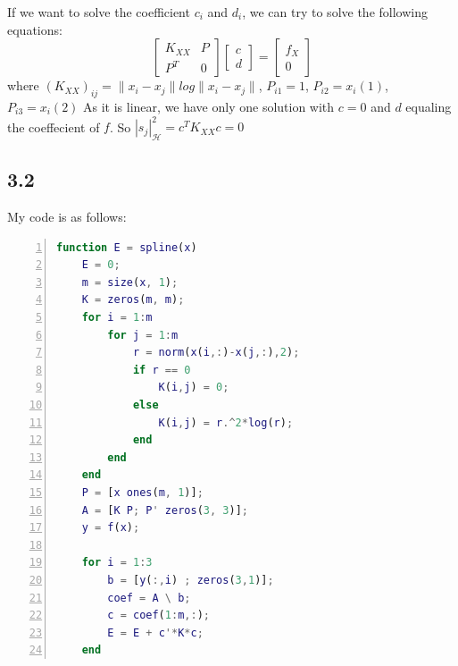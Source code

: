 \documentclass[a4paper, 11pt]{article}
\begin{document}
If we want to solve the coefficient $c_i$ and $d_i$, we can try to solve the following equations:
$$
\begin{bmatrix}
K_{XX} & P \\
P^T &    0
\end{bmatrix}
\begin{bmatrix}
c \\ d
\end{bmatrix}
=
\begin{bmatrix}
f_X \\ 0
\end{bmatrix}
$$
where $(K_{XX})_{ij} = \|x_i-x_j\|log\|x_i-x_j\|$,
$P_{i1}=1$, $P_{i2}=x_i(1)$, $P_{i3}=x_i(2)$
As it is linear, we have only one solution with $c=0$ and $d$ equaling the coeffecient of $f$.
So $|s_j|_{\mathcal{H}}^2=c^TK_{XX}c = 0$
\subsection*{3.2}
My code is as follows:
\begin{lstlisting}[language = Matlab, numbers=left,   
  numberstyle=\tiny,keywordstyle=\color{blue!70},  
  commentstyle=\color{red!50!green!50!blue!50},frame=shadowbox,  
  rulesepcolor=\color{red!20!green!20!blue!20},basicstyle=\ttfamily,
  tabsize=2]
function E = spline(x)
	E = 0;
	m = size(x, 1);
	K = zeros(m, m);
	for i = 1:m
		for j = 1:m
			r = norm(x(i,:)-x(j,:),2);
			if r == 0
				K(i,j) = 0;
			else
				K(i,j) = r.^2*log(r);
			end
		end
	end
	P = [x ones(m, 1)];
	A = [K P; P' zeros(3, 3)];
	y = f(x);

	for i = 1:3
		b = [y(:,i) ; zeros(3,1)];
		coef = A \ b;
		c = coef(1:m,:);
		E = E + c'*K*c;
	end
\end{lstlisting}
\end{document}
